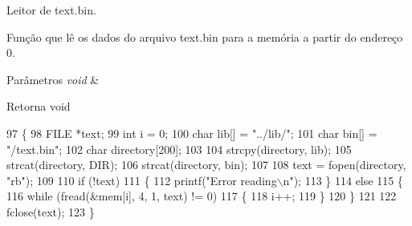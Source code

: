 Leitor de text.\+bin. 

Função que lê os dados do arquivo text.\+bin para a memória a partir do endereço 0. 
\begin{DoxyParams}{Parâmetros}
{\em void} & \\
\hline
\end{DoxyParams}
\begin{DoxyReturn}{Retorna}
void 
\end{DoxyReturn}

\begin{DoxyCode}
97 \{
98     FILE *text;
99     \textcolor{keywordtype}{int} i = 0;
100     \textcolor{keywordtype}{char} lib[] = \textcolor{stringliteral}{"../lib/"};
101     \textcolor{keywordtype}{char} bin[] = \textcolor{stringliteral}{"/text.bin"};
102     \textcolor{keywordtype}{char} directory[200];
103 
104     strcpy(directory, lib);
105     strcat(directory, DIR);
106     strcat(directory, bin);
107 
108     text = fopen(directory, \textcolor{stringliteral}{"rb"});
109 
110     \textcolor{keywordflow}{if} (!text)
111     \{
112         printf(\textcolor{stringliteral}{"Error reading\(\backslash\)n"});
113     \}
114     \textcolor{keywordflow}{else}
115     \{
116         \textcolor{keywordflow}{while} (fread(&mem[i], 4, 1, text) != 0)
117         \{
118             i++;
119         \}
120     \}
121 
122     fclose(text);
123 \}
\end{DoxyCode}
